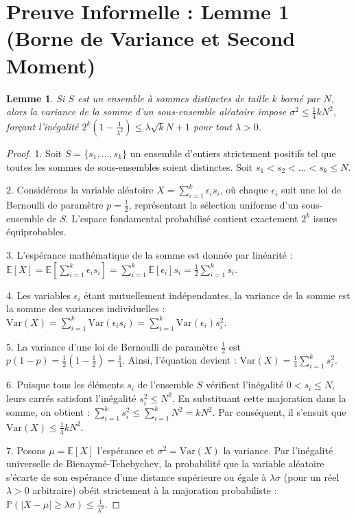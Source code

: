 \documentclass[11pt,a4paper]{article}
\newtheorem{lemma}[theorem]{Lemme}
\begin{document}
\newpage
\section{Preuve Informelle : Lemme 1 (Borne de Variance et Second Moment)}

\begin{lemma}
Si $S$ est un ensemble à sommes distinctes de taille $k$ borné par $N$, alors la variance de la somme d'un sous-ensemble aléatoire impose $\sigma^2 \le \frac{1}{4} k N^2$, forçant l'inégalité $2^k (1 - \frac{1}{\lambda^2}) \le \lambda \sqrt{k} N + 1$ pour tout $\lambda > 0$.
\end{lemma}

\begin{proof}
1. Soit $S = \{s_1, \dots, s_k\}$ un ensemble d'entiers strictement positifs tel que toutes les sommes de sous-ensembles soient distinctes. Soit $s_1 < s_2 < \dots < s_k \le N$.

2. Considérons la variable aléatoire $X = \sum_{i=1}^k \epsilon_i s_i$, où chaque $\epsilon_i$ suit une loi de Bernoulli de paramètre $p = \frac{1}{2}$, représentant la sélection uniforme d'un sous-ensemble de $S$. L'espace fondamental probabilisé contient exactement $2^k$ issues équiprobables.

3. L'espérance mathématique de la somme est donnée par linéarité : $\mathbb{E}[X] = \mathbb{E}\left[\sum_{i=1}^k \epsilon_i s_i\right] = \sum_{i=1}^k \mathbb{E}[\epsilon_i] s_i = \frac{1}{2} \sum_{i=1}^k s_i$.

4. Les variables $\epsilon_i$ étant mutuellement indépendantes, la variance de la somme est la somme des variances individuelles : $\text{Var}(X) = \sum_{i=1}^k \text{Var}(\epsilon_i s_i) = \sum_{i=1}^k \text{Var}(\epsilon_i) s_i^2$.

5. La variance d'une loi de Bernoulli de paramètre $\frac{1}{2}$ est $p(1-p) = \frac{1}{2} \left(1 - \frac{1}{2}\right) = \frac{1}{4}$. Ainsi, l'équation devient : $\text{Var}(X) = \frac{1}{4} \sum_{i=1}^k s_i^2$.

6. Puisque tous les éléments $s_i$ de l'ensemble $S$ vérifient l'inégalité $0 < s_i \le N$, leurs carrés satisfont l'inégalité $s_i^2 \le N^2$. En substituant cette majoration dans la somme, on obtient : $\sum_{i=1}^k s_i^2 \le \sum_{i=1}^k N^2 = k N^2$. Par conséquent, il s'ensuit que $\text{Var}(X) \le \frac{1}{4} k N^2$.

7. Posons $\mu = \mathbb{E}[X]$ l'espérance et $\sigma^2 = \text{Var}(X)$ la variance. Par l'inégalité universelle de Bienaymé-Tchebychev, la probabilité que la variable aléatoire s'écarte de son espérance d'une distance supérieure ou égale à $\lambda \sigma$ (pour un réel $\lambda > 0$ arbitraire) obéit strictement à la majoration probabiliste : $\mathbb{P}(|X - \mu| \ge \lambda \sigma) \le \frac{1}{\lambda^2}$.


\end{proof}
\end{document}
